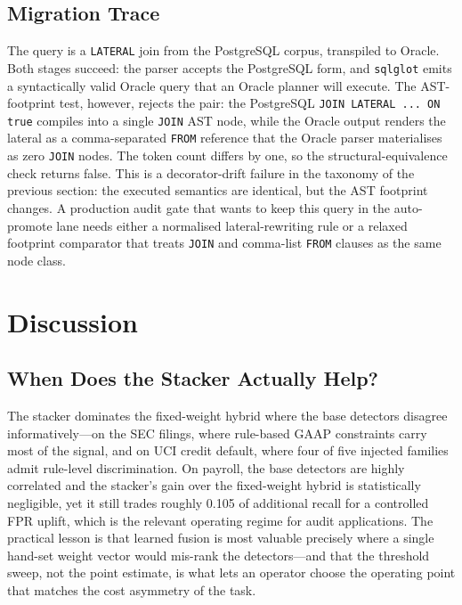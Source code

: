 \documentclass{ieeeaccess}
\begin{document}
\subsection{Migration Trace}

The query is a \texttt{LATERAL} join from the PostgreSQL corpus, transpiled to
Oracle. Both stages succeed: the parser accepts the PostgreSQL form, and
\texttt{sqlglot} emits a syntactically valid Oracle query that an Oracle planner
will execute. The AST-footprint test, however, rejects the pair: the PostgreSQL
\texttt{JOIN LATERAL ... ON true} compiles into a single \texttt{JOIN} AST node,
while the Oracle output renders the lateral as a comma-separated \texttt{FROM}
reference that the Oracle parser materialises as zero \texttt{JOIN} nodes. The
token count differs by one, so the structural-equivalence check returns false.
This is a decorator-drift failure in the taxonomy of the previous section: the
executed semantics are identical, but the AST footprint changes. A production
audit gate that wants to keep this query in the auto-promote lane needs either a
normalised lateral-rewriting rule or a relaxed footprint comparator that treats
\texttt{JOIN} and comma-list \texttt{FROM} clauses as the same node class.

\section{Discussion}
\label{sec:discussion}

\subsection{When Does the Stacker Actually Help?}

The stacker dominates the fixed-weight hybrid where the base detectors disagree
informatively---on the SEC filings, where rule-based GAAP constraints carry most
of the signal, and on UCI credit default, where four of five injected families
admit rule-level discrimination. On payroll, the base detectors are highly
correlated and the stacker's gain over the fixed-weight hybrid is statistically
negligible, yet it still trades roughly 0.105 of additional recall for a
controlled FPR uplift, which is the relevant operating regime for audit
applications. The practical lesson is that learned fusion is most valuable
precisely where a single hand-set weight vector would mis-rank the
detectors---and that the threshold sweep, not the point estimate, is what lets an
operator choose the operating point that matches the cost asymmetry of the task.
\end{document}
